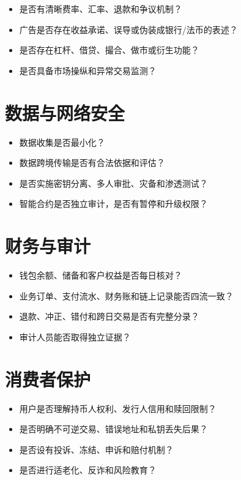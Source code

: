 \begin{itemize}
\tightlist
\item
  是否有清晰费率、汇率、退款和争议机制？
\item
  广告是否存在收益承诺、误导或伪装成银行/法币的表述？
\item
  是否存在杠杆、借贷、撮合、做市或衍生功能？
\item
  是否具备市场操纵和异常交易监测？
\end{itemize}

\section{数据与网络安全}\label{ux6570ux636eux4e0eux7f51ux7edcux5b89ux5168}

\begin{itemize}
\tightlist
\item
  数据收集是否最小化？
\item
  数据跨境传输是否有合法依据和评估？
\item
  是否实施密钥分离、多人审批、灾备和渗透测试？
\item
  智能合约是否独立审计，是否有暂停和升级权限？
\end{itemize}

\section{财务与审计}\label{ux8d22ux52a1ux4e0eux5ba1ux8ba1}

\begin{itemize}
\tightlist
\item
  钱包余额、储备和客户权益是否每日核对？
\item
  业务订单、支付流水、财务账和链上记录能否四流一致？
\item
  退款、冲正、错付和跨日交易是否有完整分录？
\item
  审计人员能否取得独立证据？
\end{itemize}

\section{消费者保护}\label{ux6d88ux8d39ux8005ux4fddux62a4}

\begin{itemize}
\tightlist
\item
  用户是否理解持币人权利、发行人信用和赎回限制？
\item
  是否明确不可逆交易、错误地址和私钥丢失后果？
\item
  是否设有投诉、冻结、申诉和赔付机制？
\item
  是否进行适老化、反诈和风险教育？
\end{itemize}

